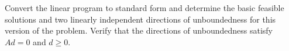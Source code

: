 Convert the linear program to standard form and determine the basic feasible solutions and two linearly independent
directions of unboundedness for this version of the problem. Verify that the directions of unboundedness satisfy 
$Ad = 0$ and $d \ge 0$.

\begin{solution}
  \ \\
\end{solution}
